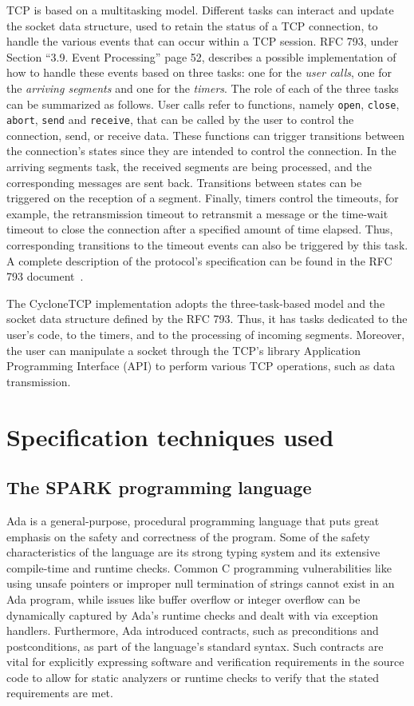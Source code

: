 \documentclass[conference]{IEEEtran}
\begin{document}
TCP is based on a multitasking model. Different tasks can interact and update the socket data structure, used to retain the status of a TCP connection, to handle the various events that can occur within a TCP session. RFC 793, under Section ``3.9. Event Processing'' page 52, describes a possible implementation of how to handle these events based on three tasks: one for the \emph{user calls}, one for the \emph{arriving segments} and one for the \emph{timers}. The role of each of the three tasks can be summarized as follows. User calls refer to functions, namely \texttt{open}, \texttt{close}, \texttt{abort}, \texttt{send} and \texttt{receive}, that can be called by the user to control the connection, send, or receive data. These functions can trigger transitions between the connection's states since they are intended to control the connection. In the arriving segments task, the received segments are being processed,
and the corresponding messages are sent back. Transitions between states can be triggered on the reception of a segment. Finally, timers control the timeouts, for example, the retransmission timeout to retransmit a message or the time-wait timeout to close the connection after a specified amount of time elapsed. Thus, corresponding transitions to the timeout events can also be triggered by this task. A complete description of the protocol's specification can be found in the RFC 793 document~\cite{rfc793}.

The CycloneTCP implementation adopts the three-task-based model and the socket data structure defined by the RFC 793. Thus, it has tasks dedicated to the user's code, to the timers, and to the processing of incoming segments. Moreover, the user can manipulate a socket through the TCP's library Application Programming Interface (API) to perform various TCP operations, such as data transmission.

\section{Specification techniques used}
\label{sec:spec}

\subsection{The SPARK programming language}

Ada is a general-purpose, procedural programming language that puts great emphasis on the safety and correctness of the program. Some of the safety characteristics of the language are its strong typing system and its extensive compile-time and runtime checks. Common C programming vulnerabilities like using unsafe pointers or improper null termination of strings cannot exist in an Ada program, while issues like buffer overflow or integer overflow can be dynamically captured by Ada’s runtime checks and dealt with via exception handlers. Furthermore, Ada introduced contracts, such as preconditions and postconditions, as part of the language’s standard syntax. Such contracts are vital for explicitly expressing software and verification requirements in the source code to allow for static analyzers or runtime checks to verify that the stated requirements are met.
\end{document}
